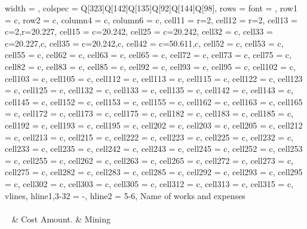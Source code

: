 \begin{longtblr}[
  caption = {\bfseries Table 3 - Calculation of costs for the extraction and processing of one m3 of rock mass for 2022-2023},
  label = none,
  entry = none,
]{
  width = \linewidth,
  colspec = {Q[323]Q[142]Q[135]Q[92]Q[144]Q[98]},
  rows = {font = \footnotesize},
  row{1} = {c},
  row{2} = {c},
  column{4} = {c},
  column{6} = {c},
  cell{1}{1} = {r=2}{},
  cell{1}{2} = {r=2}{},
  cell{1}{3} = {c=2,r=2}{0.227\linewidth},
  cell{1}{5} = {c=2}{0.242\linewidth},
  cell{2}{5} = {c=2}{0.242\linewidth},
  cell{3}{2} = {c},
  cell{3}{3} = {c=2}{0.227\linewidth,c},
  cell{3}{5} = {c=2}{0.242\linewidth,c},
  cell{4}{2} = {c=5}{0.611\linewidth,c},
  cell{5}{2} = {c},
  cell{5}{3} = {c},
  cell{5}{5} = {c},
  cell{6}{2} = {c},
  cell{6}{3} = {c},
  cell{6}{5} = {c},
  cell{7}{2} = {c},
  cell{7}{3} = {c},
  cell{7}{5} = {c},
  cell{8}{2} = {c},
  cell{8}{3} = {c},
  cell{8}{5} = {c},
  cell{9}{2} = {c},
  cell{9}{3} = {c},
  cell{9}{5} = {c},
  cell{10}{2} = {c},
  cell{10}{3} = {c},
  cell{10}{5} = {c},
  cell{11}{2} = {c},
  cell{11}{3} = {c},
  cell{11}{5} = {c},
  cell{12}{2} = {c},
  cell{12}{3} = {c},
  cell{12}{5} = {c},
  cell{13}{2} = {c},
  cell{13}{3} = {c},
  cell{13}{5} = {c},
  cell{14}{2} = {c},
  cell{14}{3} = {c},
  cell{14}{5} = {c},
  cell{15}{2} = {c},
  cell{15}{3} = {c},
  cell{15}{5} = {c},
  cell{16}{2} = {c},
  cell{16}{3} = {c},
  cell{16}{5} = {c},
  cell{17}{2} = {c},
  cell{17}{3} = {c},
  cell{17}{5} = {c},
  cell{18}{2} = {c},
  cell{18}{3} = {c},
  cell{18}{5} = {c},
  cell{19}{2} = {c},
  cell{19}{3} = {c},
  cell{19}{5} = {c},
  cell{20}{2} = {c},
  cell{20}{3} = {c},
  cell{20}{5} = {c},
  cell{21}{2} = {c},
  cell{21}{3} = {c},
  cell{21}{5} = {c},
  cell{22}{2} = {c},
  cell{22}{3} = {c},
  cell{22}{5} = {c},
  cell{23}{2} = {c},
  cell{23}{3} = {c},
  cell{23}{5} = {c},
  cell{24}{2} = {c},
  cell{24}{3} = {c},
  cell{24}{5} = {c},
  cell{25}{2} = {c},
  cell{25}{3} = {c},
  cell{25}{5} = {c},
  cell{26}{2} = {c},
  cell{26}{3} = {c},
  cell{26}{5} = {c},
  cell{27}{2} = {c},
  cell{27}{3} = {c},
  cell{27}{5} = {c},
  cell{28}{2} = {c},
  cell{28}{3} = {c},
  cell{28}{5} = {c},
  cell{29}{2} = {c},
  cell{29}{3} = {c},
  cell{29}{5} = {c},
  cell{30}{2} = {c},
  cell{30}{3} = {c},
  cell{30}{5} = {c},
  cell{31}{2} = {c},
  cell{31}{3} = {c},
  cell{31}{5} = {c},
  vlines,
  hline{1,3-32} = {-}{},
  hline{2} = {5-6}{},
}
{
			Name
			of works and expenses
			\\~\\~} & Cost
			Amount. & Mining

\end{longtblr}
